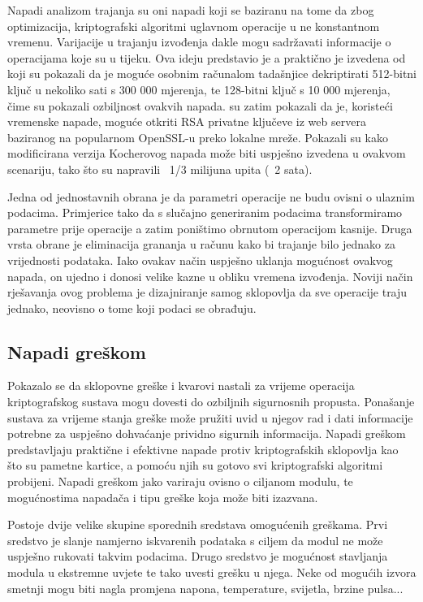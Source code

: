 \documentclass[times, utf8, diplomski]{fer}
\begin{document}
Napadi analizom trajanja  su oni napadi koji se baziranu na tome da zbog optimizacija, kriptografski algoritmi uglavnom operacije u ne konstantnom vremenu. Varijacije u trajanju izvođenja dakle mogu sadržavati informacije o operacijama koje su u tijeku. Ova ideju predstavio je \cite{kocher1996timing} a praktično je izvedena od \cite{dhem1998practical} koji su pokazali da je moguće osobnim računalom tadašnjice dekriptirati 512-bitni ključ u nekoliko sati s 300 000 mjerenja, te 128-bitni ključ s 10 000 mjerenja, čime su pokazali ozbiljnost ovakvih napada. \cite{brumley2005remote} su zatim pokazali da je, koristeći vremenske napade, moguće otkriti RSA privatne ključeve iz web servera baziranog na popularnom OpenSSL-u preko lokalne mreže. Pokazali su kako modificirana verzija Kocherovog napada može biti uspješno izvedena u ovakvom scenariju, tako što su napravili ~1/3 milijuna upita (~2 sata).

Jedna od jednostavnih obrana je da parametri operacije ne budu ovisni o ulaznim podacima. Primjerice tako da s slučajno generiranim podacima transformiramo parametre prije operacije a zatim poništimo obrnutom operacijom kasnije. Druga vrsta obrane je eliminacija grananja u računu kako bi trajanje bilo jednako za vrijednosti podataka. Iako ovakav način uspješno uklanja mogućnost ovakvog napada, on ujedno i donosi velike kazne u obliku vremena izvođenja. Noviji način rješavanja ovog problema je dizajniranje samog sklopovlja da sve operacije traju jednako, neovisno o tome koji podaci se obrađuju.


\subsection{Napadi greškom}

Pokazalo se da sklopovne greške i kvarovi nastali za vrijeme operacija kriptografskog sustava mogu dovesti do ozbiljnih sigurnosnih propusta. Ponašanje sustava za vrijeme stanja greške može pružiti uvid u njegov rad i dati informacije potrebne za uspješno dohvaćanje prividno sigurnih informacija. Napadi greškom  predstavljaju praktične i efektivne napade protiv kriptografskih sklopovlja kao što su pametne kartice, a pomoću njih su gotovo svi kriptografski algoritmi probijeni. Napadi greškom jako variraju ovisno o ciljanom modulu, te mogućnostima napadača i tipu greške koja može biti izazvana.

Postoje dvije velike skupine sporednih sredstava omogućenih greškama. Prvi sredstvo je slanje namjerno iskvarenih podataka s ciljem da modul ne može uspješno rukovati takvim podacima. Drugo sredstvo je mogućnost stavljanja modula u ekstremne uvjete te tako uvesti grešku u njega. Neke od mogućih izvora smetnji mogu biti nagla promjena napona, temperature, svijetla, brzine pulsa...
\end{document}
